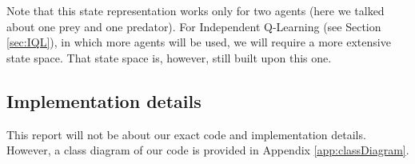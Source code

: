 Note that this state representation works only for two agents (here we talked about one prey and one predator). For Independent Q-Learning (see Section \ref{sec:IQL}), in which more agents will be used, we will require a more extensive state space. That state space is, however, still built upon this one.

\subsection{Implementation details}
This report will not be about our exact code and implementation details. However, a class diagram of our code is provided in Appendix \ref{app:classDiagram}.
